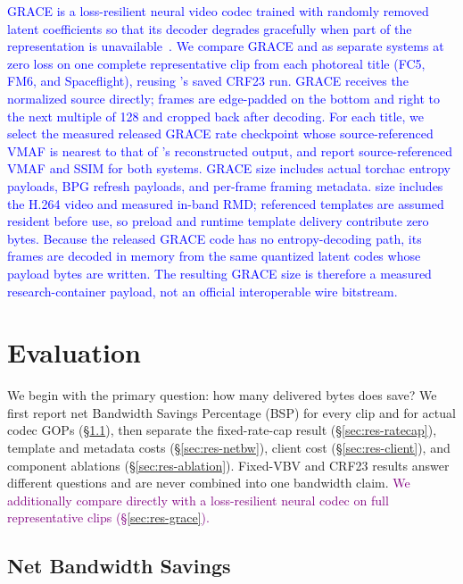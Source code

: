 \textcolor{blue}{
GRACE is a loss-resilient neural video codec trained with randomly removed
latent coefficients so that its decoder degrades gracefully when part of the
representation is unavailable~\cite{grace_nsdi24}. We compare GRACE and
\sysname as separate systems at zero loss on one complete representative clip
from each photoreal title (FC5, FM6, and Spaceflight), reusing \sysname's saved
CRF23 run. GRACE receives the normalized source directly; frames are
edge-padded on the bottom and right to
the next multiple of 128 and cropped back after decoding. For each title, we
select the measured released GRACE rate checkpoint whose source-referenced
VMAF is nearest to that of \sysname's reconstructed output, and report
source-referenced VMAF and SSIM for both systems. GRACE size includes actual
torchac entropy payloads, BPG refresh payloads, and per-frame framing metadata.
\sysname size includes the H.264 video and measured in-band RMD; referenced
templates are assumed resident before use, so preload and runtime template
delivery contribute zero bytes. Because the released GRACE code has no
entropy-decoding path, its frames are decoded in memory from the same
quantized latent codes whose payload bytes are written. The resulting GRACE
size is therefore a measured research-container payload, not an official
interoperable wire bitstream.}

\vspace{0.5pt}
\section{Evaluation}
\label{sec:results}

We begin with the primary question: how many delivered bytes does \sysname save?
We first report net Bandwidth Savings Percentage (BSP) for every clip and for actual codec GOPs
(\S\ref{sec:res-bsp}), then separate the fixed-rate-cap result
(\S\ref{sec:res-ratecap}), template and metadata costs (\S\ref{sec:res-netbw}),
client cost (\S\ref{sec:res-client}), and component ablations
(\S\ref{sec:res-ablation}). Fixed-VBV and CRF23 results answer different
questions and are never combined into one bandwidth claim.
\textcolor{purple}{We additionally compare \sysname directly with a
loss-resilient neural codec on full representative clips
(\S\ref{sec:res-grace}).}

\subsection{Net Bandwidth Savings}
\label{sec:res-bsp}

